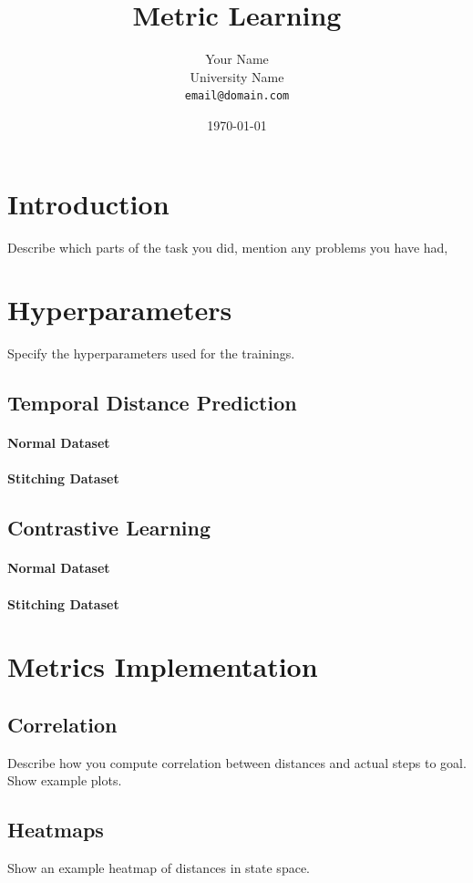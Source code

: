 \documentclass[11pt]{article}
\title{Metric Learning}
\author{Your Name \\ \small University Name \\ \small\texttt{email@domain.com}}
\date{\today}
\begin{document}
\maketitle

\section{Introduction}
Describe which parts of the task you did, mention any problems you have had, 

\section{Hyperparameters}
Specify the hyperparameters used for the trainings.
\subsection{Temporal Distance Prediction}
\paragraph{Normal Dataset}
\paragraph{Stitching Dataset}


\subsection{Contrastive Learning}
\paragraph{Normal Dataset}
\paragraph{Stitching Dataset}

\section{Metrics Implementation}
\subsection{Correlation}
Describe how you compute correlation between distances and actual steps to goal. Show example plots.

\subsection{Heatmaps}
Show an example heatmap of distances in state space.
\end{document}
